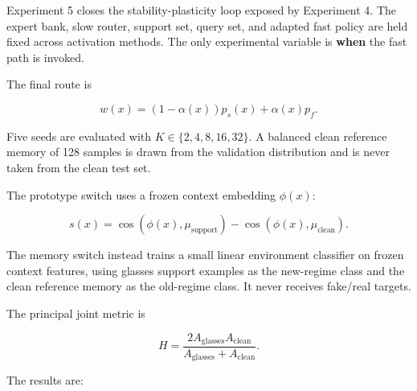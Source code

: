 \documentclass[
  10pt,
]{article}
\begin{document}
Experiment 5 closes the stability-plasticity loop exposed by Experiment
4. The expert bank, slow router, support set, query set, and adapted
fast policy are held fixed across activation methods. The only
experimental variable is \textbf{when} the fast path is invoked.

The final route is

\[
w(x)=(1-\alpha(x))p_s(x)+\alpha(x)p_f.
\]

Five seeds are evaluated with \(K\in\{2,4,8,16,32\}\). A balanced clean
reference memory of 128 samples is drawn from the validation
distribution and is never taken from the clean test set.

The prototype switch uses a frozen context embedding \(\phi(x)\):

\[
s(x)=
\cos(\phi(x),\mu_{\mathrm{support}})
-
\cos(\phi(x),\mu_{\mathrm{clean}}).
\]

The memory switch instead trains a small linear environment classifier
on frozen context features, using glasses support examples as the
new-regime class and the clean reference memory as the old-regime class.
It never receives fake/real targets.

The principal joint metric is

\[
H=
\frac{2A_{\mathrm{glasses}}A_{\mathrm{clean}}}
{A_{\mathrm{glasses}}+A_{\mathrm{clean}}}.
\]

The results are:
\end{document}
